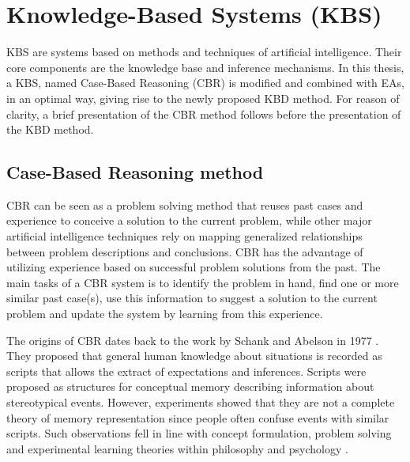 
\section{Knowledge-Based Systems (KBS)}  
KBS \cite{Akerkar:2009:KS:1795845}  are systems based on methods and techniques of artificial intelligence. Their core components are the knowledge base and inference mechanisms. In this thesis, a KBS, named Case-Based Reasoning (CBR) \cite{kolodner_1991} is modified and combined with EAs, in an optimal way, giving rise to the newly proposed KBD method. For reason of clarity, a brief presentation of the CBR method follows before the presentation of the KBD method.  

\subsection{Case-Based Reasoning method}
CBR \cite{kolodner_1991,kolodner_1993,slade_1991,riesbeck_1989} can be seen as a problem solving method that reuses past cases and experience to conceive a solution to the current problem, 
while other major artificial intelligence techniques rely on mapping generalized 
relationships between problem descriptions and conclusions. CBR has the advantage 
of utilizing  experience based on successful problem solutions from the past. 
The main tasks of a CBR system is to identify the problem in hand, find one or 
more similar past case(s), use this information to suggest a solution to the current 
problem and update the system by learning from this experience.      

\label{History} The origins of CBR dates back to the work by
Schank and Abelson in 1977 \cite{Schank_Abelson_1977}. They proposed that general 
human knowledge about situations is recorded as scripts that allows the extract 
of expectations and inferences. Scripts were proposed as structures for conceptual 
memory describing information about stereotypical events. However, experiments 
showed that they are not a complete theory of memory representation since people 
often confuse events with similar scripts. Such observations fell in line with 
concept formulation, problem solving and experimental learning theories within 
philosophy and psychology \cite{tulving_1977,smith_1978}. 

